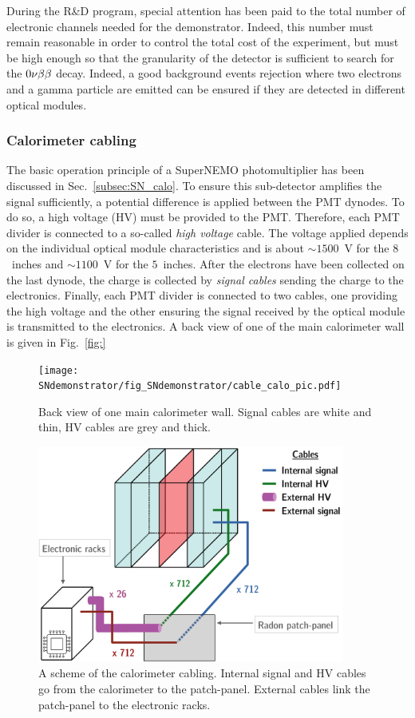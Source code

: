 During the R\&D program, special attention has been paid to the total number of electronic channels needed for the demonstrator.
Indeed, this number must remain reasonable in order to control the total cost of the experiment, but must be high enough so that the granularity of the detector is sufficient to search for the $0\nu\beta\beta$ decay.
Indeed, a good background events rejection where two electrons and a gamma particle are emitted can be ensured if they are detected in different optical modules.


\subsubsection*{Calorimeter cabling}

The basic operation principle of a SuperNEMO photomultiplier has been discussed in Sec.~\ref{subsec:SN_calo}.
To ensure this sub-detector amplifies the signal sufficiently, a potential difference is applied between the PMT dynodes.
To do so, a high voltage (HV) must be provided to the PMT.
Therefore, each PMT divider is connected to a so-called \emph{high voltage} cable.
The voltage applied depends on the individual optical module characteristics and is about $\sim1500$~V for the $8$~inches and $\sim1100$~V for the $5$~inches.
After the electrons have been collected on the last dynode, the charge is collected by \emph{signal cables} sending the charge to the electronics.
Finally, each PMT divider is connected to two cables, one providing the high voltage and the other ensuring the signal received by the optical module is transmitted to the electronics.
A back view of one of the main calorimeter wall is given in Fig.~\ref{fig:}
\begin{figure}[h]
  \centering
  \texttt{[image: SNdemonstrator/fig\_SNdemonstrator/cable\_calo\_pic.pdf]}
  \caption{Back view of one main calorimeter wall.
    Signal cables are white and thin, HV cables are grey and thick.
    \label{fig:calo_cabling}}
\end{figure}

\begin{figure}[h]
  \centering
  \includegraphics[width=0.9\textwidth]{SNdemonstrator/fig_SNdemonstrator/calo_cabling.pdf}
  \caption{A scheme of the calorimeter cabling.
    Internal signal and HV cables go from the calorimeter to the patch-panel.
    External cables link the patch-panel to the electronic racks.
    \label{fig:calo_cabling}}
\end{figure}

